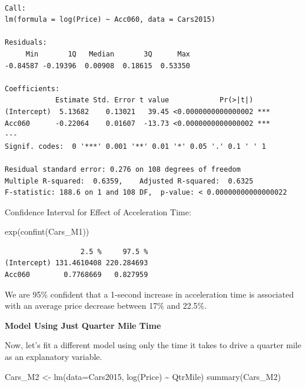 \documentclass[
  letterpaper,
  DIV=11,
  numbers=noendperiod]{scrreprt}
\newenvironment{Shaded}{\begin{snugshade}}{\end{snugshade}}
\newcommand{\AttributeTok}[1]{\textcolor[rgb]{0.40,0.45,0.13}{#1}}
\newcommand{\FunctionTok}[1]{\textcolor[rgb]{0.28,0.35,0.67}{#1}}
\newcommand{\NormalTok}[1]{\textcolor[rgb]{0.00,0.23,0.31}{#1}}
\newcommand{\OtherTok}[1]{\textcolor[rgb]{0.00,0.23,0.31}{#1}}
\newcommand{\SpecialCharTok}[1]{\textcolor[rgb]{0.37,0.37,0.37}{#1}}
\begin{document}
\begin{verbatim}

Call:
lm(formula = log(Price) ~ Acc060, data = Cars2015)

Residuals:
     Min       1Q   Median       3Q      Max 
-0.84587 -0.19396  0.00908  0.18615  0.53350 

Coefficients:
            Estimate Std. Error t value            Pr(>|t|)    
(Intercept)  5.13682    0.13021   39.45 <0.0000000000000002 ***
Acc060      -0.22064    0.01607  -13.73 <0.0000000000000002 ***
---
Signif. codes:  0 '***' 0.001 '**' 0.01 '*' 0.05 '.' 0.1 ' ' 1

Residual standard error: 0.276 on 108 degrees of freedom
Multiple R-squared:  0.6359,    Adjusted R-squared:  0.6325 
F-statistic: 188.6 on 1 and 108 DF,  p-value: < 0.00000000000000022
\end{verbatim}

Confidence Interval for Effect of Acceleration Time:

\begin{Shaded}
\begin{Highlighting}[]
\FunctionTok{exp}\NormalTok{(}\FunctionTok{confint}\NormalTok{(Cars\_M1))}
\end{Highlighting}
\end{Shaded}

\begin{verbatim}
                  2.5 %     97.5 %
(Intercept) 131.4610408 220.284693
Acc060        0.7768669   0.827959
\end{verbatim}

We are 95\% confident that a 1-second increase in acceleration time is
associated with an average price decrease between 17\% and 22.5\%.

\textbf{Model Using Just Quarter Mile Time}

Now, let's fit a different model using only the time it takes to drive a
quarter mile as an explanatory variable.

\begin{Shaded}
\begin{Highlighting}[]
\NormalTok{Cars\_M2 }\OtherTok{\textless{}{-}} \FunctionTok{lm}\NormalTok{(}\AttributeTok{data=}\NormalTok{Cars2015, }\FunctionTok{log}\NormalTok{(Price) }\SpecialCharTok{\textasciitilde{}}\NormalTok{ QtrMile)}
\FunctionTok{summary}\NormalTok{(Cars\_M2)}
\end{Highlighting}
\end{Shaded}
\end{document}
